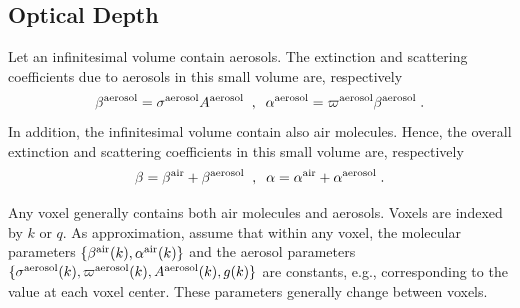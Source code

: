 \documentclass[10pt,twocolumn,letterpaper]{article}
\newcommand{\derivsym}[1]{\,d{#1}}
\begin{document}


\subsection{Optical Depth}
\label{sec:optical-depth}

Let an infinitesimal volume contain aerosols. The extinction and scattering coefficients 
due to aerosols in this small volume are, respectively
\begin{equation}
  \beta^{\rm aerosol}=\sigma^{\rm aerosol} A^{\rm aerosol}
  \;\;,\;\;  
  \alpha^{\rm aerosol}=\varpi^{\rm aerosol} \beta^{\rm aerosol}
  \;.
  \label{eq:betaer}
\end{equation}
In addition, the infinitesimal volume contain also air molecules. Hence, the overall 
extinction and scattering coefficients in this small volume are, respectively
\begin{equation}
  \beta=\beta^{\rm air}+\beta^{\rm aerosol}
  \;\;,\;\;
  \alpha=\alpha^{\rm air}+\alpha^{\rm aerosol}
  \;.
  \label{eq:betaer}
\end{equation}

Any voxel generally contains both air molecules and aerosols. Voxels are indexed by $k$ or $q$. 
As approximation, assume that within any voxel, the molecular parameters
$\{ \beta^{\rm air}(k),\alpha^{\rm air}(k)\}$ and the aerosol parameters 
$\{ \sigma^{\rm aerosol}(k),\varpi^{\rm aerosol}(k), A^{\rm aerosol}(k),g(k)\}$ 
are constants, e.g., corresponding to the value at each voxel center. These parameters generally change 
between voxels. 
\end{document}
